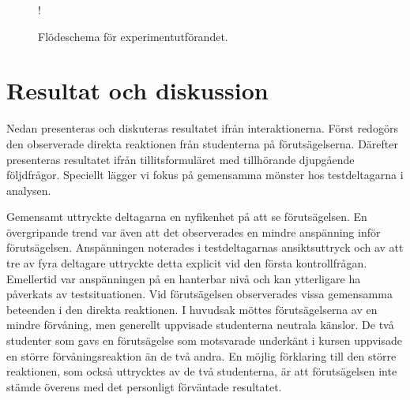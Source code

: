 \begin{figure}[hbtp]
    \centering
    \resizebox {\textwidth} {!} {
        
    }
    \caption{Flödeschema för experimentutförandet.}
    \label{fig:raket8}
\end{figure}

\section{Resultat och diskussion}
\label{sec: inter-RD}
Nedan presenteras och diskuteras resultatet ifrån interaktionerna. Först redogörs den observerade direkta reaktionen från studenterna på förutsägelserna. Därefter presenteras resultatet ifrån tillitsformuläret med tillhörande djupgående följdfrågor. Speciellt lägger vi fokus på gemensamma mönster hos testdeltagarna i analysen.

Gemensamt uttryckte deltagarna en nyfikenhet på att se förutsägelsen. En övergripande trend var även att det observerades en mindre anspänning inför förutsägelsen. Anspänningen noterades i testdeltagarnas ansiktsuttryck och av att tre av fyra deltagare uttryckte detta explicit vid den första kontrollfrågan. Emellertid var anspänningen på en hanterbar nivå och kan ytterligare ha påverkats av testsituationen. Vid förutsägelsen observerades vissa gemensamma beteenden i den direkta reaktionen. I huvudsak möttes förutsägelserna av en mindre förvåning, men generellt uppvisade studenterna neutrala känslor. De två studenter som gavs en förutsägelse som motsvarade underkänt i kursen uppvisade en större förvåningsreaktion än de två andra. En möjlig förklaring till den större reaktionen, som också uttrycktes av de två studenterna, är att förutsägelsen inte stämde överens med det personligt förväntade resultatet.

